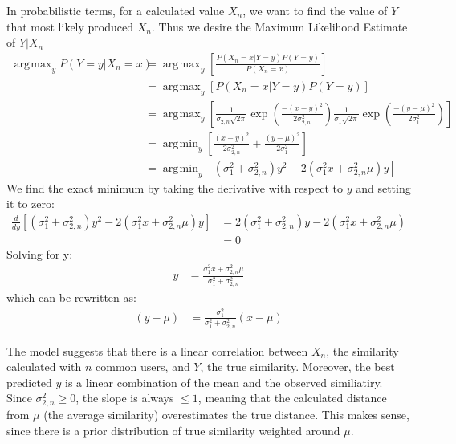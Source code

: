 \documentclass[11pt]{article}
\DeclareMathOperator*{\argmax}{arg\!\max}
\DeclareMathOperator*{\argmin}{arg\!\min}
\begin{document}
In probabilistic terms, for a calculated value $X_n$, we want to find the value
of $Y$ that most likely produced $X_n$. Thus we desire the Maximum Likelihood
Estimate of $Y | X_n$
\begin{align}
\argmax_yP(Y=y|X_n=x) &= \argmax_y\left[\frac{P(X_n=x |
Y=y)P(Y=y)}{P(X_n=x)}\right]
\\&= \argmax_y\left[P(X_n=x|Y=y)P(Y=y)\right]
\\&= 
\argmax_y\left[\frac{1}{\sigma_{2,n}\sqrt{2\pi}}\exp{\left(\frac{-(x-y)^2}
{2\sigma_{2,n}^2}\right)}
\frac{1}{\sigma_{1}\sqrt{2\pi}}\exp{\left(\frac{-(y-\mu)^2}
{2\sigma_{1}^2}\right)}\right]
\\&= \argmin_y\left[\frac{(x-y)^2}{2\sigma_{2,n}^2} +
\frac{(y-\mu)^2}{2\sigma_{1}^2}\right]
\\&= \argmin_y\left[\left(\sigma_{1}^2+\sigma_{2,n}^2\right)y^2 - 
2\left(\sigma_{1}^2x+\sigma_{2,n}^2\mu\right)y\right]
\end{align}
We find the exact minimum by taking the derivative with respect to $y$ and
setting it to zero:
\begin{align}
\frac{d}{dy}\left[\left(\sigma_{1}^2+\sigma_{2,n}^2\right)y^2 - 
2\left(\sigma_{1}^2x+\sigma_{2,n}^2\mu\right)y\right]
&= 2\left(\sigma_{1}^2+\sigma_{2,n}^2\right)y - 
2\left(\sigma_{1}^2x+\sigma_{2,n}^2\mu\right) 
\\&= 0
\end{align}
Solving for y:
\begin{align}
y &= \frac{\sigma_{1}^2x+\sigma_{2,n}^2\mu}{\sigma_{1}^2+\sigma_{2,n}^2}
\end{align}
which can be rewritten as:
\begin{align}
\left(y - \mu\right) &= \frac{\sigma_{1}^2}{\sigma_{1}^2+\sigma_{2,n}^2}
\left(x-\mu\right)
\end{align}

The model suggests that there is a linear correlation between $X_n$, the
similarity calculated with $n$ common users, and $Y$, the true similarity.
Moreover, the best predicted $y$ is a linear combination of the mean and the
observed similiatiry. Since $\sigma_{2,n}^2\ge0$, the slope is always $\le1$, 
meaning that the calculated distance from $\mu$ (the average similarity) 
overestimates the true distance. This makes sense, since there is a prior 
distribution of true similarity weighted around $\mu$.
\end{document}
